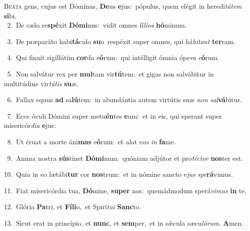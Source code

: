 \lettrine{\initial\textcolor{\initialcolor}{B}}{eáta} gens, cujus est Dóminus, \textbf{De}\-us \textbf{e}\-jus:~\star pópulus, quem elégit in heredi\-\textit{tá}\-\textit{tem} \textbf{si}\-bi.\\
{\numbfont\textcolor{\numbcolor}{~2.}}~De cælo re\-\textbf{spé}\-xit \textbf{Dó}\-\textbf{mi}nus:~\star vidit omnes fí\-\textit{li}\-\textit{os} \textbf{hó}\-minum.\par
{\numbfont\textcolor{\numbcolor}{~3.}}~De præparáto habi\-\textbf{tá}\-culo \textbf{su}\-o~\star respéxit super omnes, qui há\-\textit{bi}\-\textit{tant} \textbf{ter}\-ram.\par
{\numbfont\textcolor{\numbcolor}{~4.}}~Qui finxit sigillátim \textbf{cor}\-da e\-\textbf{ó}\-rum:~\star qui intélligit ómnia ópe\textit{ra} \textit{e}\-\textbf{ó}rum.\par
{\numbfont\textcolor{\numbcolor}{~5.}}~Non salvátur rex per \textbf{mul}\-tam vir\-\textbf{tú}\-tem:~\star et gigas non salvábitur in multitúdine vir\-\textit{tú}\-\textit{tis} \textbf{su}\-æ.\par
{\numbfont\textcolor{\numbcolor}{~6.}}~Fallax equus \textbf{ad} sa\-\textbf{lú}\-tem:~\star in abundántia autem virtútis suæ \textit{non} \textit{sal}\-\textbf{vá}bitur.\par
{\numbfont\textcolor{\numbcolor}{~7.}}~Ecce óculi Dómini super metu\-\textbf{én}\-tes \textbf{e}\-um:~\star et in eis, qui sperant super misericór\-\textit{di}\-\textit{a} \textbf{e}\-jus:\par
{\numbfont\textcolor{\numbcolor}{~8.}}~Ut éruat a morte áni\textbf{mas} e\-\textbf{ó}\-rum:~\star et alat e\textit{os} \textit{in} \textbf{fa}\-me.\par
{\numbfont\textcolor{\numbcolor}{~9.}}~Anima nostra \textbf{sús}\-tinet \textbf{Dó}\-\textbf{mi}num:~\star quóniam adjútor et pro\-\textit{téc}\-\textit{tor} \textbf{nos}\-ter est.\par
{\numbfont\textcolor{\numbcolor}{10.}}~Quia in eo lætábi\textbf{tur} cor \textbf{nos}\-trum:~\star et in nómine sancto e\textit{jus} \textit{spe}\-\textbf{rá}vimus.\par
{\numbfont\textcolor{\numbcolor}{11.}}~Fiat misericórdia tua, \textbf{Dó}\-mine, \textbf{su}\-\textbf{per} nos:~\star quemádmodum sperá\-\textit{vi}\-\textit{mus} \textbf{in} te.\par
{\numbfont\textcolor{\numbcolor}{12.}}~Glória \textbf{Pa}\-tri, et \textbf{Fí}\-\textbf{li}o,~\star et Spirí\-\textit{tu}\-\textit{i} \textbf{Sanc}\-to.\par
{\numbfont\textcolor{\numbcolor}{13.}}~Sicut erat in princípio, et \textbf{nunc}\-, et \textbf{sem}\-per,~\star et in sǽcula sæcu\-\textit{ló}\-\textit{rum}. \textbf{A}\-men.\par
